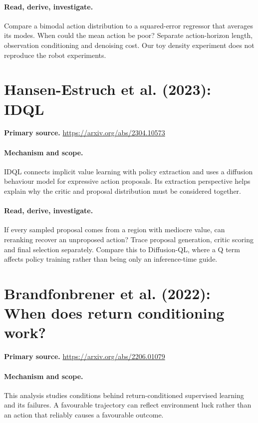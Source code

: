 \documentclass[11pt]{scrartcl}
\begin{document}
\paragraph{Read, derive, investigate.} Compare a bimodal action distribution to a squared-error regressor that averages its modes. When could the mean action be poor? Separate action-horizon length, observation conditioning and denoising cost. Our toy density experiment does not reproduce the robot experiments.

\section{Hansen-Estruch et al. (2023): IDQL}
\noindent\textbf{Primary source.} \url{https://arxiv.org/abs/2304.10573}

\paragraph{Mechanism and scope.} IDQL connects implicit value learning with policy extraction and uses a diffusion behaviour model for expressive action proposals. Its extraction perspective helps explain why the critic and proposal distribution must be considered together.

\paragraph{Read, derive, investigate.} If every sampled proposal comes from a region with mediocre value, can reranking recover an unproposed action? Trace proposal generation, critic scoring and final selection separately. Compare this to Diffusion-QL, where a Q term affects policy training rather than being only an inference-time guide.

\section{Brandfonbrener et al. (2022): When does return conditioning work?}
\noindent\textbf{Primary source.} \url{https://arxiv.org/abs/2206.01079}

\paragraph{Mechanism and scope.} This analysis studies conditions behind return-conditioned supervised learning and its failures. A favourable trajectory can reflect environment luck rather than an action that reliably causes a favourable outcome.
\end{document}
